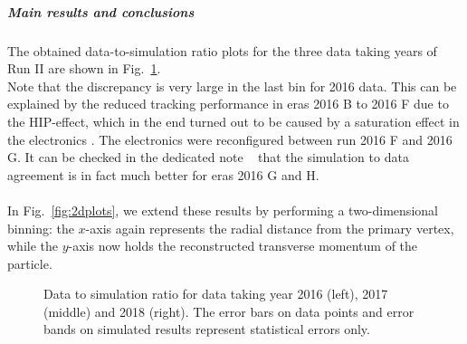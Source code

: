 \subparagraph{Main results and conclusions}\label{sec:mainresults}
The obtained data-to-simulation ratio plots for the three data taking
years of Run II are shown in Fig.~\ref{fig:1dplots_2016_2017_2018}. \\
Note that the discrepancy is very large in the last bin for 2016 data. This can be explained by the reduced tracking performance in eras 2016 B to 2016 F due to the HIP-effect, which in the end turned out to be caused by a saturation effect in the electronics \cite{hipeffect}. The electronics were reconfigured between run 2016 F and 2016 G. It can be checked in the dedicated note ~\cite{AN-20-111_KshortStudy} that the simulation to data agreement is in fact much better for eras 2016 G and H. \\ \\
In Fig.~\ref{fig:2dplots}, we extend these results by performing a two-dimensional binning: the $x$-axis again represents the radial distance from the primary vertex, while the $y$-axis now holds the reconstructed transverse momentum of the particle. 

\begin{figure}[h]
\noindent
{}
	\caption{Data to simulation ratio for data taking year 2016
          (left), 2017 (middle) and 2018 (right). The error bars on data points and error bands on simulated results represent statistical errors only.}
	\label{fig:1dplots_2016_2017_2018}
\end{figure}

